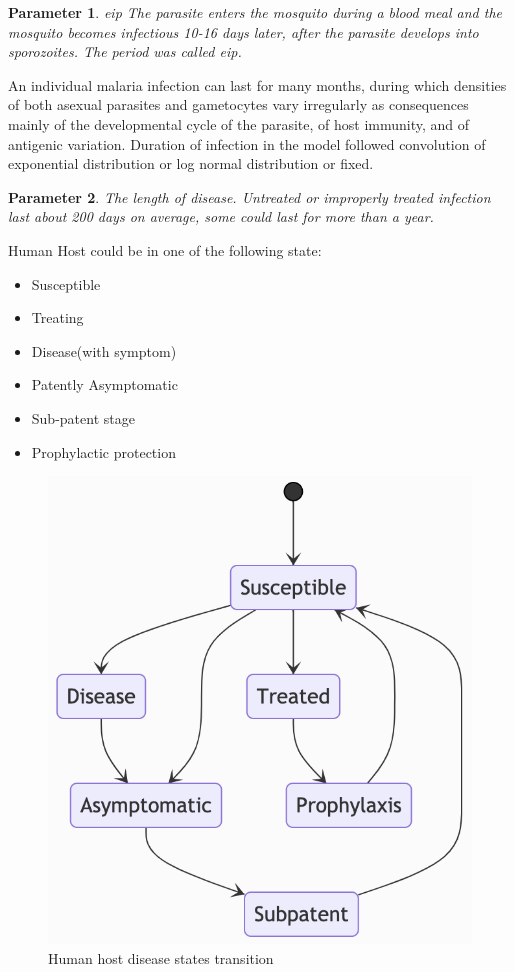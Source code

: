 \documentclass[a4paper, 12pt, twoside]{article}
\newtheorem{parameter}{Parameter}
\begin{document}
\begin{parameter}{\gls{eip}}
	The parasite enters the mosquito during a blood meal and the mosquito becomes infectious 10-16 days later, after the parasite develops into sporozoites.
	The period was called \gls{eip}.
\end{parameter}

An individual malaria infection can last for many months, during which densities of both asexual parasites and gametocytes vary irregularly as consequences mainly of the developmental cycle of the parasite, of host immunity, and of antigenic variation.
Duration of infection in the model followed convolution of exponential distribution or log normal distribution or fixed.

\begin{parameter}
	{The length of disease.}
	{Untreated or improperly treated infection last about 200 days on average, some could last for more than a year.}
\end{parameter}

Human Host could be in one of the following state:
\begin{itemize}
	\item Susceptible
	\item Treating
	\item Disease(with symptom)
	\item Patently Asymptomatic
	\item Sub-patent stage
	\item Prophylactic protection
\end{itemize}

\begin{figure}[t]
	\centering
	\includegraphics[keepaspectratio=true, scale=0.8]{images/disease-state-transition-diagram.png}
	\caption{Human host disease states transition}
\end{figure}
\end{document}
